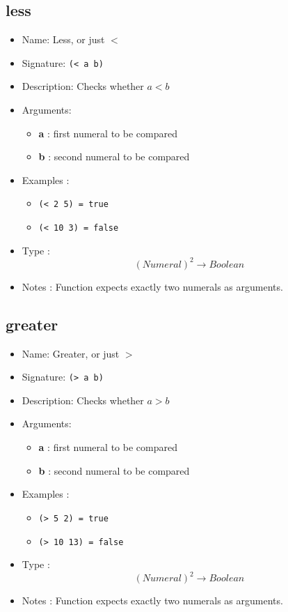\subsection{less}
\begin{itemize}
    \item Name: Less, or just $<$
    \item Signature: \texttt{(< a b)}
    \item Description: Checks whether $a < b$
    \item Arguments:
        \begin{itemize}
            \item \textbf{a} : first numeral to be compared
            \item \textbf{b} : second numeral to be compared
        \end{itemize}
    \item Examples :
        \begin{itemize}
            \item \texttt{(< 2 5) = true}
            \item \texttt{(< 10 3) = false}
        \end{itemize}
    \item Type : \[(Numeral)^2 \to Boolean\]
    \item Notes : Function expects exactly two numerals as arguments.
\end{itemize}

\subsection{greater}
\begin{itemize}
    \item Name: Greater, or just $>$
    \item Signature: \texttt{(> a b)}
    \item Description: Checks whether $a > b$
    \item Arguments:
        \begin{itemize}
            \item \textbf{a} : first numeral to be compared
            \item \textbf{b} : second numeral to be compared
        \end{itemize}
    \item Examples :
        \begin{itemize}
            \item \texttt{(> 5 2) = true}
            \item \texttt{(> 10 13) = false}
        \end{itemize}
    \item Type : \[(Numeral)^2 \to Boolean\]
    \item Notes : Function expects exactly two numerals as arguments.
\end{itemize}

